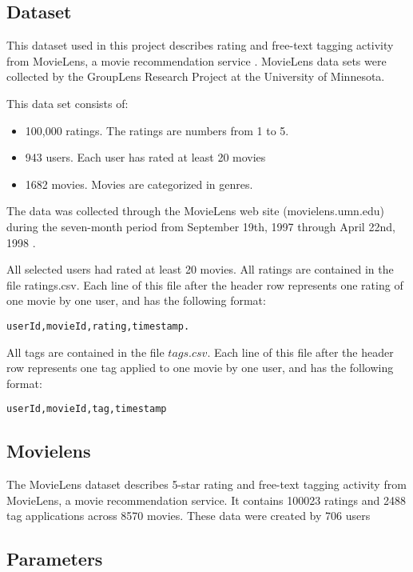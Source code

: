 \subsection{Dataset}
\label{sec:dataset}

This dataset used in this project describes rating and free-text tagging activity from MovieLens, a movie recommendation service \cite{movielensdata}.
MovieLens data sets were collected by the GroupLens Research Project at the University of Minnesota.
 
This data set consists of:
\begin{itemize}
\item 100,000 ratings. The ratings are numbers from 1 to 5.
\item 943 users. Each user has rated at least 20 movies
\item 1682 movies. Movies are categorized in genres. 
\end{itemize}

The data was collected through the MovieLens web site (movielens.umn.edu) during the seven-month period from September 19th, 1997 through April 22nd, 1998 \cite{movielens}.

All selected users had rated at least 20 movies.
All ratings are contained in the file ratings.csv. Each line of this file after the header row represents one rating of one movie by one user, and has the following format:

\begin{verbatim}
userId,movieId,rating,timestamp.
\end{verbatim}

All tags are contained in the file $tags.csv$. Each line of this file after the header row represents one tag applied to one movie by one user, and has the following format:
\begin{verbatim}
userId,movieId,tag,timestamp
\end{verbatim}

\subsection{Movielens}
\label{sec:movielens}

The MovieLens dataset describes 5-star rating and free-text tagging activity from MovieLens, a movie recommendation service. It contains 100023 ratings and 2488 tag applications across 8570 movies. These data were created by 706 users 

\subsection{Parameters}
\label{sec:parameters}

